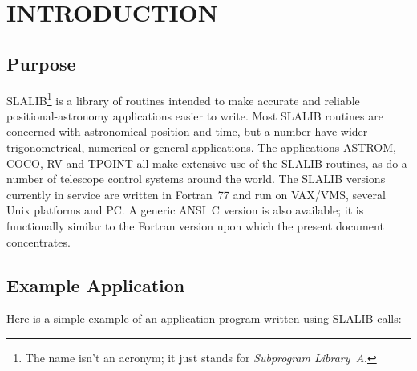 \newcommand{\aref}[1]
{
  \goodbreak
  \setlength{\oldspacing}{\topsep}
  \setlength{\topsep}{0.3ex}
  \begin{description}
    \item[REFERENCE]:
        #1
  \end{description}
  \setlength{\topsep}{\oldspacing}
}
\newcommand{\refs}[1]
{
  \goodbreak
  \setlength{\oldspacing}{\topsep}
  \setlength{\topsep}{0.3ex}
  \begin{description}
    \item[REFERENCES]:
        #1
  \end{description}
  \setlength{\topsep}{\oldspacing}
}

\section{INTRODUCTION}
\subsection{Purpose}
SLALIB\footnote{The name isn't an acronym;
it just stands for {\it Subprogram Library~A}.}
is a library of routines
intended to make accurate and reliable positional-astronomy
applications easier to write.
Most SLALIB routines are concerned with astronomical position and time, but a
number have wider trigonometrical, numerical or general applications.
The applications ASTROM, COCO, RV and TPOINT
all make extensive use of the SLALIB
routines, as do a number of telescope control systems around the world.
The SLALIB versions currently in service are written in
Fortran~77 and run on VAX/VMS, several Unix platforms and PC.
A generic ANSI~C version is also available;  it is functionally
similar to the Fortran version upon which the present document
concentrates.

\subsection{Example Application}
Here is a simple example of an application program written
using SLALIB calls:

